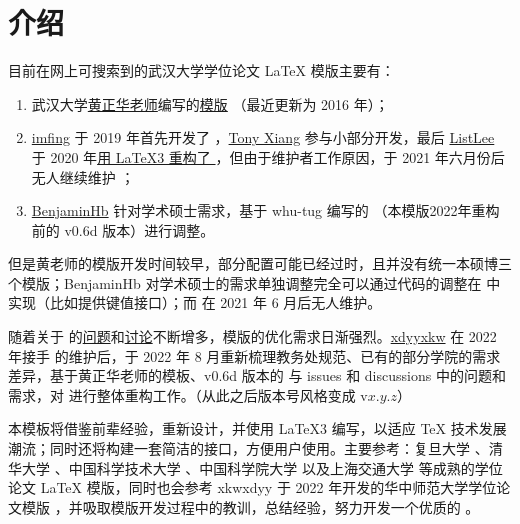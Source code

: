 
\section{介绍}

目前在网上可搜索到的武汉大学学位论文 \LaTeX{} 模版主要有：

\begin{enumerate}
  \item 武汉大学\href{http://aff.whu.edu.cn/huangzh/}{黄正华老师}编写的\href{http://aff.whu.edu.cn/huangzh/#:~:text=%E4%B8%8B%E5%88%97-,%E6%AF%95%E4%B8%9A%E8%AE%BA%E6%96%87%E6%A8%A1%E6%9D%BF,-%2C%20%E9%80%82%E7%94%A8%E4%BA%8E%20TeX}{模版} （最近更新为 2016 年）；
  \item \href{https://github.com/imfing}{imfing} 于 2019 年首先开发了 ，\href{https://github.com/T0nyX1ang}{Tony Xiang} 参与小部分开发，最后 \href{https://github.com/tanukihee}{ListLee} 于 2020 年\href{https://github.com/whutug/whu-thesis/commit/d488438b7819ddf5a128081a50b118d8fd4ec1ef}{用 \LaTeX3 重构了 }，但由于维护者工作原因，于 2021 年六月份后无人继续维护 ；
  \item \href{https://github.com/BenjaminHb/whu-thesis}{BenjaminHb} 针对学术硕士需求，基于 whu-tug 编写的 \href{https://github.com/whutug/whu-thesis}{} （本模版2022年重构前的 v0.6d 版本）进行调整。
\end{enumerate}

但是黄老师的模版开发时间较早，部分配置可能已经过时，且并没有统一本硕博三个模版；BenjaminHb 对学术硕士的需求单独调整完全可以通过代码的调整在  中实现（比如提供键值接口）；而  在 2021 年 6 月后无人维护。

随着关于  的\href{https://github.com/whutug/whu-thesis/issues}{问题}和\href{https://github.com/whutug/whu-thesis/discussions}{讨论}不断增多，模版的优化需求日渐强烈。\href{https://github.com/xkwxdyy}{xdyyxkw} 在 2022 年接手  的维护后，于 2022 年 8 月重新梳理教务处规范、已有的部分学院的需求差异，基于黄正华老师的模板、v0.6d 版本的  与 issues 和 discussions 中的问题和需求，对  进行整体重构工作。（从此之后版本号风格变成 v$x.y.z$）

本模板将借鉴前辈经验，重新设计，并使用 \LaTeX3 编写，以适应 \TeX{} 技术发展潮流；同时还将构建一套简洁的接口，方便用户使用。主要参考：复旦大学 、清华大学 、中国科学技术大学 、中国科学院大学  以及上海交通大学  等成熟的学位论文 \LaTeX{} 模版，同时也会参考 xkwxdyy 于 2022 年开发的华中师范大学学位论文模版 ，并吸取模版开发过程中的教训，总结经验，努力开发一个优质的 。
